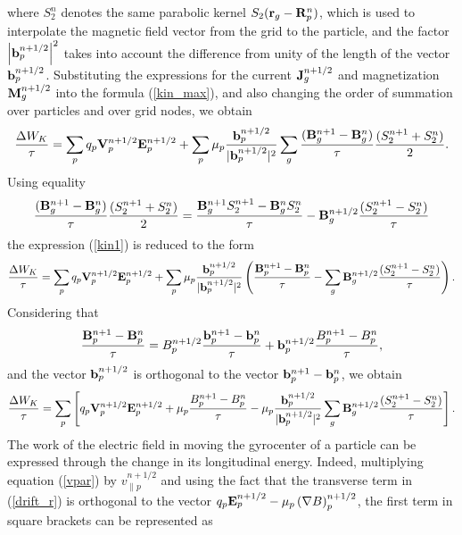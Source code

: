 \documentclass[final,3p]{elsarticle}
\begin{document}
where $S_2^n$ denotes the same parabolic kernel $S_2({\bf r}_g-{\bf R}_p^n)$, which is used to interpolate the magnetic field vector from the grid to the particle, and the factor $\left|{\bf b}_p^{n+1/2}\right|^2$ takes into account the difference from unity of the length of the vector ${\bf b}_p^{n+1/2}$. Substituting the expressions for the current ${\bf J}_g^{n+1/2}$ and magnetization ${\bf M}_g^{n+1/2}$ into the formula (\ref{kin_max}), and also changing the order of summation over particles and over grid nodes, we obtain
\begin{align}\label{kin1}
	\frac{\Delta W_K}{\tau}=\sum\limits_p q_p {\bf V}_p^{n+1/2} {\bf E}_p^{n+1/2}+ \sum\limits_p \mu_p \frac{{\bf b}_p^{n+1/2}}{|{\bf b}_p^{n+1/2}|^2} \sum\limits_g \frac{({\bf B}_g^{n+1}-{\bf B}_g^{n})}{\tau} \frac{(S_2^{n+1}+S_2^n)}{2}.
\end{align}
Using equality
\begin{equation}
	\frac{({\bf B}_g^{n+1}-{\bf B}_g^{n})}{\tau} \frac{(S_2^{n+1}+S_2^n)}{2}=\frac{{\bf B}_g^{n+1} S_2^{n+1}-{\bf B}_g^{n} S_2^{n}}{\tau}-{\bf B}_g^{n+1/2} \frac{(S_2^{n+1}-S_2^n)}{\tau}
\end{equation}
the expression (\ref{kin1}) is reduced to the form
\begin{align}
	\frac{\Delta W_K}{\tau}=\sum\limits_p q_p {\bf V}_p^{n+1/2} {\bf E}_p^{n+1/2}+ \sum\limits_p \mu_p \frac{{\bf b}_p^{n+1/2}}{|{\bf b}_p^{n+1/2}|^2}\left(\frac{{\bf B}_p^{n+1}-{\bf B}_p^{n}}{\tau}-\sum\limits_g {\bf B}_g^{n+1/2} \frac{(S_2^{n+1}-S_2^n)}{\tau}\right).
\end{align}
Considering that
\begin{equation}
	\frac{{\bf B}_p^{n+1}-{\bf B}_p^{n}}{\tau}=B_p^{n+1/2}\frac{{\bf b}_p^{n+1}-{\bf b}_p^{n}}{\tau}+{\bf b}_p^{n+1/2}\frac{B_p^{n+1}-B_p^n}{\tau},
\end{equation}
and the vector ${\bf b}_p^{n+1/2}$ is orthogonal to the vector ${\bf b}_p^{n+1}-{\bf b}_p^{n}$, we obtain
\begin{align}
	\frac{\Delta W_K}{\tau}=\sum\limits_p\left[ q_p {\bf V}_p^{n+1/2} {\bf E}_p^{n+1/2}+ \mu_p \frac{B_p^{n+1}-B_p^n}{\tau} - \mu_p \frac{{\bf b}_p^{n+1/2}}{|{\bf b}_p^{n+1/2}|^2}\sum\limits_g {\bf B}_g^{n+1/2} \frac{(S_2^{n+1}-S_2^n)}{\tau} \right] .
\end{align}
The work of the electric field in moving the gyrocenter of a particle can be expressed through the change in its longitudinal energy. Indeed, multiplying equation (\ref{vpar}) by $v_{\|p}^{n+1/2}$ and using the fact that the transverse term in (\ref{drift_r}) is orthogonal to the vector $q_p{\bf E}_p^{n+1/2}-\mu_p\left(\nabla B\right)_p^{n+1/2}$, the first term in square brackets can be represented as
\end{document}
